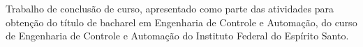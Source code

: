 {
\center          
{\large\MakeUppercase{\imprimirautor}}\par
\vfill
{\bfseries\large\MakeUppercase\imprimirtitulo}\par
\vspace{10 mm}
\hspace{.35\textwidth}
\begin{minipage}{.6\textwidth}
    \SingleSpacing
    Trabalho de conclusão de curso, apresentado como parte das atividades para obtenção do título de bacharel em Engenharia de Controle e Automação, do curso de Engenharia de Controle e Automação do Instituto Federal do Espírito Santo. 
    \par
    \par
    \vspace{0.5cm}
    \imprimirorientadorRotulo
    {\large  } \imprimirorientador\par
    \imprimircoorientadorRotulo
    {\large  } \imprimircoorientador\par
\end{minipage}
\vfill 
\vfill
{\large\MakeUppercase\imprimirlocal}\par
{\large\imprimirdata}\par
}